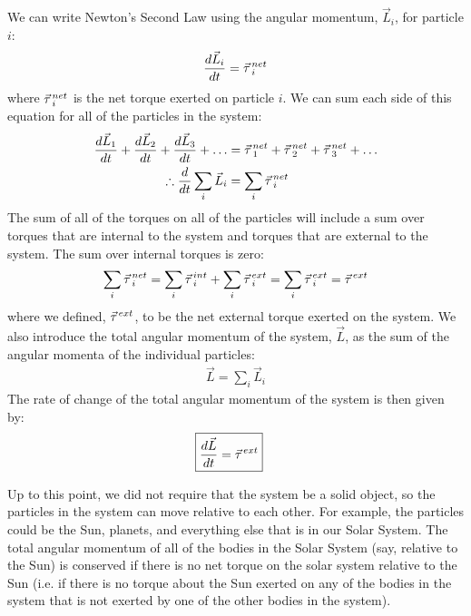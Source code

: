 We can write Newton's Second Law using the angular momentum, $\vec L_i$, for particle $i$:
\begin{align*}
\frac{d\vec L_i}{dt} = \pvec \tau_i^{net}
\end{align*}
where $\pvec \tau_i^{net}$ is the net torque exerted on particle $i$. We can sum each side of this equation for all of the particles in the system:
\begin{align*}
\frac{d\vec L_1}{dt} + \frac{d\vec L_2}{dt} + \frac{d\vec L_3}{dt} + \dots &= \pvec \tau_1^{net} + \pvec \tau_2^{net} +\pvec \tau_3^{net} + \dots\\
\therefore \frac{d}{dt} \sum_i\vec L_i &= \sum_i \pvec \tau_i^{net}
\end{align*}
The sum of all of the torques on all of the particles will include a sum over torques that are internal to the system and torques that are external to the system. The sum over internal torques is zero:
\begin{align*}
\sum_i \pvec\tau_i^{net} = \sum_i \pvec\tau_i^{int} + \sum_i \pvec\tau_i^{ext} = \sum_i \pvec\tau_i^{ext} = \pvec\tau^{ext}
\end{align*}
where we defined, $\pvec\tau^{ext}$, to be the net external torque exerted on the system. We also introduce the total angular momentum of the system, $\vec L$, as the sum of the angular momenta of the individual particles:
\begin{align*}
\vec L = \sum_i\vec L_i
\end{align*}
The rate of change of the total angular momentum of the system is then given by:
\begin{align}
\Aboxed{\frac{d\vec L}{dt} = \pvec \tau^{ext}}
\end{align}

Up to this point, we did not require that the system be a solid object, so the particles in the system can move relative to each other. For example, the particles could be the Sun, planets, and everything else that is in our Solar System. The total angular momentum of all of the bodies in the Solar System (say, relative to the Sun) is conserved if there is no net torque on the solar system relative to the Sun (i.e. if there is no torque about the Sun exerted on any of the bodies in the system that is not exerted by one of the other bodies in the system).

